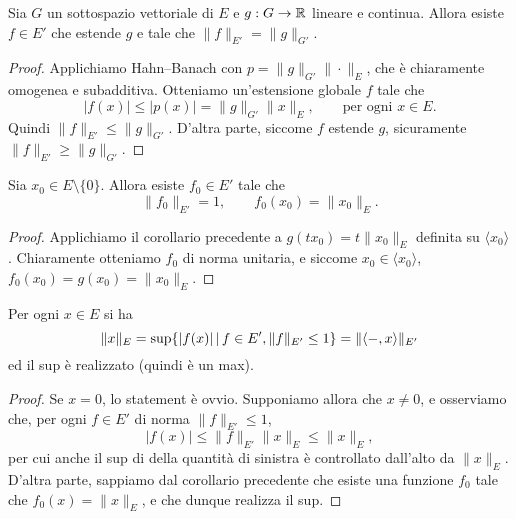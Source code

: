 \begin{corollary}
\label{cor:hahn_banach_ext}
	Sia $G$ un sottospazio vettoriale di $E$ e $g : G \to \mathbb{R}$ lineare e continua.
	Allora esiste $f \in E'$ che estende $g$ e tale che $\|f\|_{E'} = \|g\|_{G'}$.
\end{corollary}
\begin{proof}
	Applichiamo Hahn--Banach con $p = \|g\|_{G'} \|\cdot\|_E$, che è chiaramente omogenea e subadditiva. Otteniamo un'estensione globale $f$ tale che
	\begin{equation*}
		|f(x)| \leq |p(x)| = \|g\|_{G'}\|x\|_E, \qquad \text{per ogni $x \in E$}.
	\end{equation*}
	Quindi $\|f\|_{E'} \leq \|g\|_{G'}$.
	D'altra parte, siccome $f$ estende $g$, sicuramente $\|f\|_{E'} \geq \|g\|_{G'}$.
\end{proof}

\begin{corollary}
\label{cor:two_chap_1}
	Sia $x_0 \in E \setminus\{0\}$.
	Allora esiste $f_0 \in E'$ tale che
	\begin{equation*}
		\|f_0\|_{E'} = 1, \qquad f_0(x_0) = \|x_0\|_E.
	\end{equation*}
\end{corollary}
\begin{proof}
	Applichiamo il corollario precedente a $g(tx_0) = t\|x_0\|_E$ definita su $\langle x_0 \rangle$. Chiaramente otteniamo $f_0$ di norma unitaria, e siccome $x_0 \in \langle x_0 \rangle$, $f_0(x_0) = g(x_0) = \|x_0\|_E$.
\end{proof}

\begin{corollary}
\label{cor:eval_norm}
	Per ogni $x \in E$ si ha
	\begin{equation*}
		\|x\|_E = \sup \{ |f(x)| \,|\, f \in E', \|f\|_{E'} \leq 1\} = \|\langle -, x \rangle\|_{E'}
	\end{equation*}
	ed il sup è realizzato (quindi è un max).
\end{corollary}
\begin{proof}
	Se $x=0$, lo statement è ovvio. Supponiamo allora che $x \neq 0$, e osserviamo che, per ogni $f \in E'$ di norma $\|f\|_{E'} \leq 1$,
	\begin{equation*}
		|f(x)| \leq \|f\|_{E'}\|x\|_E \leq \|x\|_E,
	\end{equation*}
	per cui anche il sup di della quantità di sinistra è controllato dall'alto da $\|x\|_E$. D'altra parte, sappiamo dal corollario precedente che esiste una funzione $f_0$ tale che $f_0(x) = \|x\|_E$, e che dunque realizza il sup.
\end{proof}

